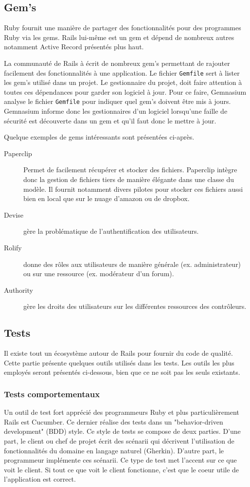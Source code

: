 \subsection{Gem's}
\label{gems}
Ruby fournit une manière de partager des fonctionnalités pour des programmes Ruby via les gems. Rails lui-même est un gem et dépend de nombreux autres notamment Active Record présentés plus haut.

La communauté de Rails à écrit de nombreux gem's permettant de rajouter facilement des fonctionnalités à une application. Le fichier \texttt{Gemfile} sert à lister les gem's utilisé dans un projet. Le gestionnaire du projet, doit faire attention à toutes ces dépendances pour garder son logiciel à jour. Pour ce faire, Gemnasium analyse le fichier \texttt{Gemfile} pour indiquer quel gem's doivent être mis à jours. Gemnasium informe donc les gestionnaires d'un logiciel lorsqu'une faille de sécurité est découverte dans un gem et qu'il faut donc le mettre à jour.

Quelque exemples de gems intéressants sont présentées ci-après.
\begin{description}
  \item[Paperclip] Permet de facilement récupérer et stocker des fichiers. Paperclip intègre donc la gestion de fichiers tiers de manière élégante dans une classe du modèle. Il fournit notamment divers pilotes pour stocker ces fichiers aussi bien en local que sur le nuage d'amazon ou de dropbox.
  \item[Devise] gère la problématique de l'authentification des utilisateurs.
  \item[Rolify] donne des rôles aux utilisateurs de manière générale (ex. administrateur) ou sur une ressource (ex. modérateur d'un forum).\label{rolify}
  \item[Authority] gère les droits des utilisateurs sur les différentes ressources des contrôleurs. \label{authority}
\end{description}

\subsection{Tests}
\label{rails-tests}
Il existe tout un écosystème autour de Rails pour fournir du code de qualité. Cette partie présente quelques outils utilisés dans les tests. Les outils les plus employés seront présentés ci-dessous, bien que ce ne soit pas les seuls existants.

\subsubsection{Tests comportementaux}
\label{cucumber}
Un outil de test fort apprécié des programmeurs Ruby et plus particulièrement Rails est Cucumber. Ce dernier réalise des tests dans un "behavior-driven development" (BDD) style. Ce style de tests se compose de deux parties. D'une part, le client ou chef de projet écrit des scénarii qui décrivent l'utilisation de fonctionnalités du domaine en langage naturel (Gherkin). D'autre part, le programmeur implémente ces scénarii. Ce type de test met l'accent sur ce que voit le client. Si tout ce que voit le client fonctionne, c'est que le coeur utile de l'application est correct. 

